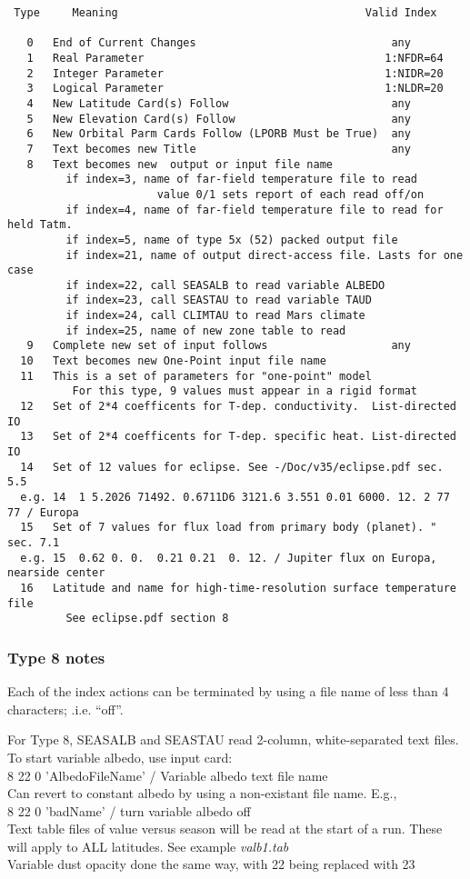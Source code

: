 \documentclass{article}
\newcommand{\qi}{\\ \hspace*{2.em}}      %
\newcommand{\nf}{\textit}  %
\begin{document}
\begin{verbatim}
 Type     Meaning                                      Valid Index

   0   End of Current Changes                              any
   1   Real Parameter                                     1:NFDR=64
   2   Integer Parameter                                  1:NIDR=20
   3   Logical Parameter                                  1:NLDR=20
   4   New Latitude Card(s) Follow                         any
   5   New Elevation Card(s) Follow                        any
   6   New Orbital Parm Cards Follow (LPORB Must be True)  any
   7   Text becomes new Title                              any
   8   Text becomes new  output or input file name
         if index=3, name of far-field temperature file to read
                       value 0/1 sets report of each read off/on
         if index=4, name of far-field temperature file to read for held Tatm.
         if index=5, name of type 5x (52) packed output file
         if index=21, name of output direct-access file. Lasts for one case
         if index=22, call SEASALB to read variable ALBEDO
         if index=23, call SEASTAU to read variable TAUD
         if index=24, call CLIMTAU to read Mars climate
         if index=25, name of new zone table to read
   9   Complete new set of input follows                   any
  10   Text becomes new One-Point input file name
  11   This is a set of parameters for "one-point" model 
          For this type, 9 values must appear in a rigid format
  12   Set of 2*4 coefficents for T-dep. conductivity.  List-directed IO
  13   Set of 2*4 coefficents for T-dep. specific heat. List-directed IO 
  14   Set of 12 values for eclipse. See -/Doc/v35/eclipse.pdf sec. 5.5 
  e.g. 14  1 5.2026 71492. 0.6711D6 3121.6 3.551 0.01 6000. 12. 2 77 77 / Europa
  15   Set of 7 values for flux load from primary body (planet). " sec. 7.1
  e.g. 15  0.62 0. 0.  0.21 0.21  0. 12. / Jupiter flux on Europa, nearside center
  16   Latitude and name for high-time-resolution surface temperature file
         See eclipse.pdf section 8
\end{verbatim}
 
\subsubsection{Type 8 notes}

Each of the index actions can be terminated by using a file name of less than 4
characters; .i.e. ``off''.

For Type 8, SEASALB and SEASTAU read 2-column, white-separated text files. \\
To start variable albedo, use input card: 
\qi  8 22 0 'AlbedoFileName' / Variable albedo text file name \\
Can revert to constant albedo by using a non-existant file name. E.g.,
\qi  8 22 0 'badName' / turn variable albedo off \\
Text table files of value versus season will be read at the start of a
run. These will apply to ALL latitudes. See example  \nf{valb1.tab}   \\
Variable dust opacity done the same way, with 22 being replaced with 23 \\
\end{document}
